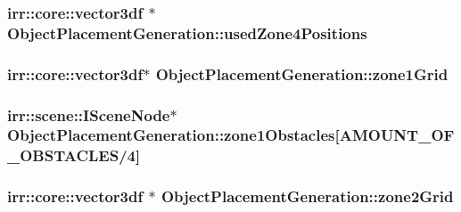 \hypertarget{class_object_placement_generation_a11edbd3cca212de7672a8fe8ff307266}{
\subsubsection[{used\-Zone4\-Positions}]{\setlength{\rightskip}{0pt plus 5cm}irr\-::core\-::vector3df $\ast$ Object\-Placement\-Generation\-::used\-Zone4\-Positions\hspace{0.3cm}{\ttfamily [private]}}}\label{class_object_placement_generation_a11edbd3cca212de7672a8fe8ff307266}
\hypertarget{class_object_placement_generation_aad1c9c2a56afd002bb8b551232292d65}{
\subsubsection[{zone1\-Grid}]{\setlength{\rightskip}{0pt plus 5cm}irr\-::core\-::vector3df$\ast$ Object\-Placement\-Generation\-::zone1\-Grid\hspace{0.3cm}{\ttfamily [private]}}}\label{class_object_placement_generation_aad1c9c2a56afd002bb8b551232292d65}
\hypertarget{class_object_placement_generation_a2718f963a994625bafdc65c84cb821ef}{
\subsubsection[{zone1\-Obstacles}]{\setlength{\rightskip}{0pt plus 5cm}irr\-::scene\-::\-I\-Scene\-Node$\ast$ Object\-Placement\-Generation\-::zone1\-Obstacles\mbox{[}{\bf A\-M\-O\-U\-N\-T\-\_\-\-O\-F\-\_\-\-O\-B\-S\-T\-A\-C\-L\-E\-S}/4\mbox{]}\hspace{0.3cm}{\ttfamily [private]}}}\label{class_object_placement_generation_a2718f963a994625bafdc65c84cb821ef}
\hypertarget{class_object_placement_generation_a2dbfd8e1e0b6dc2e25c0dd8207f473c7}{
\subsubsection[{zone2\-Grid}]{\setlength{\rightskip}{0pt plus 5cm}irr\-::core\-::vector3df $\ast$ Object\-Placement\-Generation\-::zone2\-Grid\hspace{0.3cm}{\ttfamily [private]}}}\label{class_object_placement_generation_a2dbfd8e1e0b6dc2e25c0dd8207f473c7}
